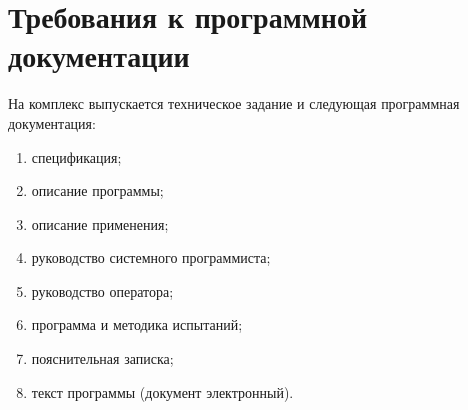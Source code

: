\newpage\section{Требования к программной документации}\label{section:Требования к программной документации}

На комплекс выпускается техническое задание и следующая
программная документация:

\begin{enumerate}
\item спецификация;
\item описание программы;
\item описание применения;
\item руководство системного программиста;
\item руководство оператора;
\item программа и методика испытаний;
\item пояснительная записка;
\item текст программы (документ электронный).
\end{enumerate}